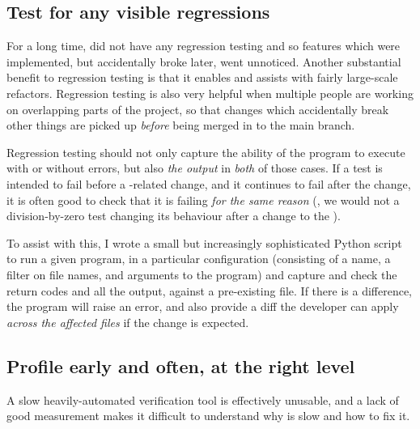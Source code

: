 \subsection{Test for any visible regressions}

For a long time,  did not have any regression testing and so features
which were implemented, but accidentally broke later, went unnoticed.
Another substantial benefit to regression testing is that it enables and assists
with fairly large-scale refactors. Regression testing is also very helpful when
multiple people are working on overlapping parts of the project, so that
changes which accidentally break other things are picked up \emph{before} being
merged in to the main branch.

Regression testing should not only capture the ability of the program to
execute with or without errors, but also \emph{the output} in \emph{both} of
those cases. If a test is intended to fail before a -related change,
and it continues to fail after the change, it is often good to check that it is
failing \emph{for the same reason} (\eg{}, we would not a division-by-zero test
changing its behaviour after a change to the ).

To assist with this, I wrote a small but increasingly sophisticated Python
script
to run a given program, in a particular configuration (consisting of a name, a
filter on file names, and arguments to the program) and capture and check the
return codes and all the output, against a pre-existing file. If there is a
difference, the program will raise an error, and also provide a diff the
developer can apply \emph{across the affected files} if the change is expected.

\subsection{Profile early and often, at the right level}\label{subsec:profile}


A slow heavily-automated verification tool is effectively unusable, and a lack
of good measurement makes it difficult to understand why  is slow and
how to fix it.

